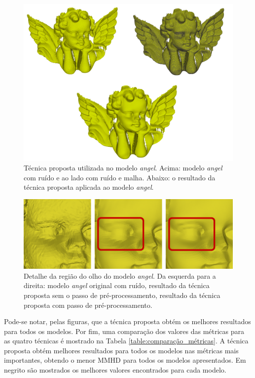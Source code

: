 \clearpage

\begin{figure}[!h]
\captionsetup{width=\linewidth}
\centering
\includegraphics[width=\linewidth]{figuras/angel_final.png}
\caption{Técnica proposta utilizada no modelo \textit{angel}. Acima: modelo \textit{angel} com ruído e ao lado com ruído e malha. Abaixo: o resultado da técnica proposta aplicada ao modelo \textit{angel}.}
\label{fig:angel_final}
\end{figure}

\vspace{10mm}

\begin{figure}[!h]
\captionsetup{width=\linewidth}
\centering
\includegraphics[width=\linewidth]{figuras/angel_detail.png}
\caption{Detalhe da região do olho do modelo \textit{angel}. Da esquerda para a direita: modelo \textit{angel} original com ruído, resultado da técnica proposta sem o passo de pré-processamento, resultado da técnica proposta com passo de pré-processamento.}
\label{fig:angel_detail}
\end{figure}


Pode-se notar, pelas figuras, que a técnica proposta obtém os melhores resultados para todos os modelos. Por fim, uma comparação dos valores das métricas para as quatro técnicas é mostrado na Tabela \ref{table:comparação_métricas}. A técnica proposta obtém melhores resultados para todos os modelos nas métricas mais importantes, obtendo o menor MMHD para todos os modelos apresentados. Em negrito são mostrados os melhores valores encontrados para cada modelo.

